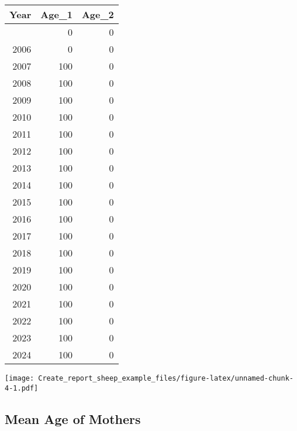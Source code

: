 \documentclass[
]{article}
\newenvironment{Shaded}{\begin{snugshade}}{\end{snugshade}}
\newcommand{\FunctionTok}[1]{\textcolor[rgb]{0.13,0.29,0.53}{\textbf{#1}}}
\newcommand{\NormalTok}[1]{#1}
\newcommand{\SpecialCharTok}[1]{\textcolor[rgb]{0.81,0.36,0.00}{\textbf{#1}}}
\begin{document}
\begin{longtable}[]{@{}rrr@{}}
\toprule\noalign{}
Year & Age\_1 & Age\_2 \\
\midrule\noalign{}
\endhead
\bottomrule\noalign{}
\endlastfoot
2005 & 0 & 0 \\
2006 & 0 & 0 \\
2007 & 100 & 0 \\
2008 & 100 & 0 \\
2009 & 100 & 0 \\
2010 & 100 & 0 \\
2011 & 100 & 0 \\
2012 & 100 & 0 \\
2013 & 100 & 0 \\
2014 & 100 & 0 \\
2015 & 100 & 0 \\
2016 & 100 & 0 \\
2017 & 100 & 0 \\
2018 & 100 & 0 \\
2019 & 100 & 0 \\
2020 & 100 & 0 \\
2021 & 100 & 0 \\
2022 & 100 & 0 \\
2023 & 100 & 0 \\
2024 & 100 & 0 \\
\end{longtable}

\begin{Shaded}
\end{Shaded}

\texttt{[image: Create\_report\_sheep\_example\_files/figure-latex/unnamed-chunk-4-1.pdf]}

\subsection{Mean Age of Mothers}\label{mean-age-of-mothers}

\begin{Shaded}
\end{Shaded}
\end{document}
